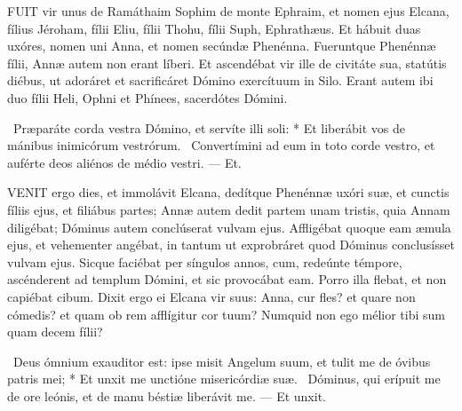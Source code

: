




\lettrine[lines=2]{F}{UIT} vir unus de Ramáthaim Sophim de monte Ephraim, et nomen ejus Elcana, fílius Jéroham, fílii Eliu, fílii Thohu, fílii Suph, Ephrathæus. Et hábuit duas uxóres, nomen uni Anna, et nomen secúndæ Phenénna. Fueruntque Phenénnæ fílii, Annæ autem non erant líberi. Et ascendébat vir ille de civitáte sua, statútis diébus, ut adoráret et sacrificáret Dómino exercítuum in Silo. Erant autem ibi duo fílii Heli, Ophni et Phínees, sacerdótes Dómini.


\R\ Præparáte corda vestra Dómino, et servíte illi soli: * Et liberábit vos de mánibus inimicórum vestrórum. \V\ Convertímini ad eum in toto corde vestro, et auférte deos aliénos de médio vestri. --- Et.


\lettrine[lines=2]{V}{ENIT} ergo dies, et immolávit Elcana, dedítque Phenénnæ uxóri suæ, et cunctis fíliis ejus, et filiábus partes; Annæ autem dedit partem unam tristis, quia Annam diligébat; Dóminus autem conclúserat vulvam ejus. Affligébat quoque eam æmula ejus, et vehementer angébat, in tantum ut exprobráret quod Dóminus conclusísset vulvam ejus. Sicque faciébat per síngulos annos, cum, redeúnte témpore, ascénderent ad templum Dómini, et sic provocábat eam. Porro illa flebat, et non capiébat cibum. Dixit ergo ei Elcana vir suus: Anna, cur fles? et quare non cómedis? et quam ob rem afflígitur cor tuum? Numquid non ego mélior tibi sum quam decem fílii?

\R\ Deus ómnium exauditor est: ipse misit Angelum suum, et tulit me de óvibus patris mei; * Et unxit me unctióne misericórdiæ suæ. \V\ Dóminus, qui erípuit me de ore leónis, et de manu béstiæ liberávit me. --- Et unxit.

